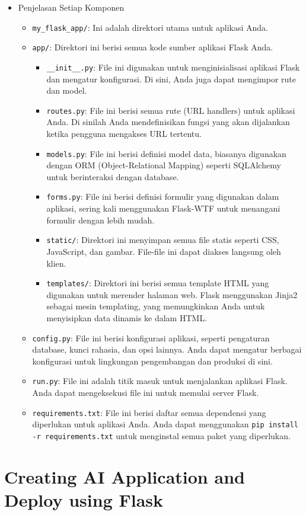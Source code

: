 \documentclass{article}
\begin{document}
\begin{itemize}
    \item Penjelasan Setiap Komponen
          \begin{itemize}
              \item \verb|my_flask_app/|: Ini adalah direktori utama untuk aplikasi Anda.
              \item \verb|app/|: Direktori ini berisi semua kode sumber aplikasi Flask Anda.
                    \begin{itemize}
                        \item \verb|__init__.py|: File ini digunakan untuk menginisialisasi aplikasi Flask dan mengatur konfigurasi. Di sini, Anda juga dapat mengimpor rute dan model.
                        \item \verb|routes.py|: File ini berisi semua rute (URL handlers) untuk aplikasi Anda. Di sinilah Anda mendefinisikan fungsi yang akan dijalankan ketika pengguna mengakses URL tertentu.
                        \item \verb|models.py|: File ini berisi definisi model data, biasanya digunakan dengan ORM (Object-Relational Mapping) seperti SQLAlchemy untuk berinteraksi dengan database.
                        \item \verb|forms.py|: File ini berisi definisi formulir yang digunakan dalam aplikasi, sering kali menggunakan Flask-WTF untuk menangani formulir dengan lebih mudah.
                        \item \verb|static/|: Direktori ini menyimpan semua file statis seperti CSS, JavaScript, dan gambar. File-file ini dapat diakses langsung oleh klien.
                        \item \verb|templates/|: Direktori ini berisi semua template HTML yang digunakan untuk merender halaman web. Flask menggunakan Jinja2 sebagai mesin templating, yang memungkinkan Anda untuk menyisipkan data dinamis ke dalam HTML\@.
                    \end{itemize}
              \item \verb|config.py|: File ini berisi konfigurasi aplikasi, seperti pengaturan database, kunci rahasia, dan opsi lainnya. Anda dapat mengatur berbagai konfigurasi untuk lingkungan pengembangan dan produksi di sini.
              \item \verb|run.py|: File ini adalah titik masuk untuk menjalankan aplikasi Flask. Anda dapat mengeksekusi file ini untuk memulai server Flask.
              \item \verb|requirements.txt|: File ini berisi daftar semua dependensi yang diperlukan untuk aplikasi Anda. Anda dapat menggunakan \verb|pip install -r requirements.txt| untuk menginstal semua paket yang diperlukan.
          \end{itemize}
\end{itemize}


\newpage

\section{Creating AI Application and Deploy using Flask}



\end{document}
